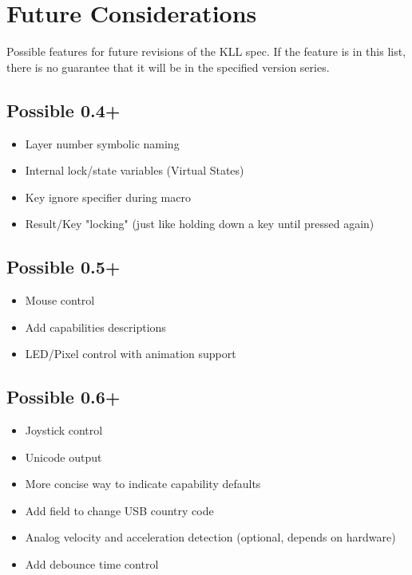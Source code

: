 \documentclass{kiibohd-template}
\begin{document}
\newpage
\chapter{Future Considerations}

Possible features for future revisions of the KLL spec.
If the feature is in this list, there is no guarantee that it will be in the specified version series.

\section{Possible 0.4+}

\begin{itemize}
\item Layer number symbolic naming
\item Internal lock/state variables (Virtual States)
\item Key ignore specifier during macro
\item Result/Key "locking" (just like holding down a key until pressed again)
\end{itemize}

\section{Possible 0.5+}

\begin{itemize}
\item Mouse control
\item Add capabilities descriptions
\item LED/Pixel control with animation support
\end{itemize}

\section{Possible 0.6+}

\begin{itemize}
\item Joystick control
\item Unicode output
\item More concise way to indicate capability defaults
\item Add field to change USB country code
\item Analog velocity and acceleration detection (optional, depends on hardware)
\item Add debounce time control
\end{itemize}
\end{document}

